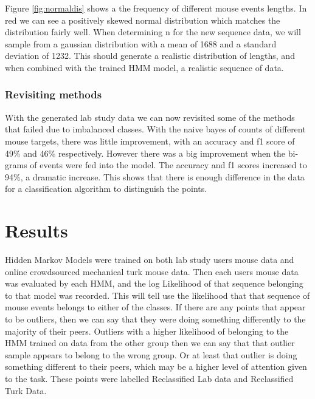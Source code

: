 \documentclass{article}
\begin{document}
Figure \ref{fig:normaldis} shows a the frequency of different mouse events lengths.
In red we can see a positively skewed normal distribution which matches the distribution fairly well.
When determining n for the new sequence data, we will sample from a gaussian distribution with a mean of 1688 and a standard deviation of 1232.
This should generate a realistic distribution of lengths, and when combined with the trained HMM model, a realistic sequence of data.



\subsubsection{Revisiting methods}

With the generated lab study data we can now revisited some of the methods that failed due to imbalanced classes.
With the naive bayes of counts of different mouse targets, there was little improvement, with an accuracy and f1 score of 49\% and 46\% respectively.
However there was a big improvement when the bi-grams of events were fed into the model.
The accuracy and f1 scores increased to 94\%, a dramatic increase.
This shows that there is enough difference in the data for a classification algorithm to distinguish the points. 

\section{Results}

Hidden Markov Models were trained on both lab study users mouse data and online crowdsourced mechanical turk mouse data.
Then each users mouse data was evaluated by each HMM, and the log Likelihood of that sequence belonging to that model was recorded. 
This will tell use the likelihood that that sequence of mouse events belongs to either of the classes.
If there are any points that appear to be outliers, then we can say that they were doing something differently to the majority of their peers.
Outliers with a higher likelihood of belonging to the HMM trained on data from the other group then we can say that that outlier sample appears to belong to the wrong group.
Or at least that outlier is doing something different to their peers, which may be a higher level of attention given to the task. 
These points were labelled Reclassified Lab data and Reclassified Turk Data.
\end{document}
